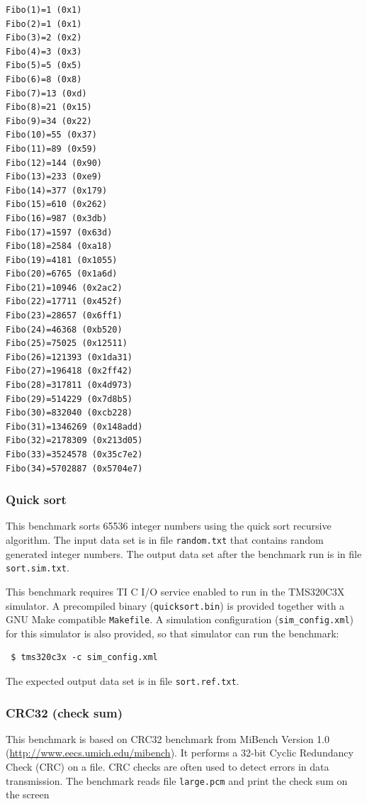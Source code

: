 \begin{verbatim}
Fibo(1)=1 (0x1)
Fibo(2)=1 (0x1)
Fibo(3)=2 (0x2)
Fibo(4)=3 (0x3)
Fibo(5)=5 (0x5)
Fibo(6)=8 (0x8)
Fibo(7)=13 (0xd)
Fibo(8)=21 (0x15)
Fibo(9)=34 (0x22)
Fibo(10)=55 (0x37)
Fibo(11)=89 (0x59)
Fibo(12)=144 (0x90)
Fibo(13)=233 (0xe9)
Fibo(14)=377 (0x179)
Fibo(15)=610 (0x262)
Fibo(16)=987 (0x3db)
Fibo(17)=1597 (0x63d)
Fibo(18)=2584 (0xa18)
Fibo(19)=4181 (0x1055)
Fibo(20)=6765 (0x1a6d)
Fibo(21)=10946 (0x2ac2)
Fibo(22)=17711 (0x452f)
Fibo(23)=28657 (0x6ff1)
Fibo(24)=46368 (0xb520)
Fibo(25)=75025 (0x12511)
Fibo(26)=121393 (0x1da31)
Fibo(27)=196418 (0x2ff42)
Fibo(28)=317811 (0x4d973)
Fibo(29)=514229 (0x7d8b5)
Fibo(30)=832040 (0xcb228)
Fibo(31)=1346269 (0x148add)
Fibo(32)=2178309 (0x213d05)
Fibo(33)=3524578 (0x35c7e2)
Fibo(34)=5702887 (0x5704e7)
\end{verbatim}

\subsubsection{Quick sort}

This benchmark sorts 65536 integer numbers using the quick sort recursive algorithm.
The input data set is in file \texttt{random.txt} that contains random generated integer numbers.
The output data set after the benchmark run is in file \texttt{sort.sim.txt}.

This benchmark requires TI C I/O service enabled to run in the TMS320C3X simulator.
A precompiled binary (\texttt{quicksort.bin}) is provided together with a GNU Make compatible \texttt{Makefile}.
A simulation configuration (\texttt{sim\_config.xml}) for this simulator is also provided, so that simulator can run the benchmark:

\begin{verbatim}
 $ tms320c3x -c sim_config.xml
\end{verbatim}

\noindent The expected output data set is in file \texttt{sort.ref.txt}.

\subsubsection{CRC32 (check sum)}

This benchmark is based on CRC32 benchmark from MiBench Version 1.0 (\url{http://www.eecs.umich.edu/mibench}).
It performs a 32-bit Cyclic Redundancy Check (CRC) on a file. CRC checks are often used to detect errors in data transmission.
The benchmark reads file \texttt{large.pcm} and print the check sum on the screen


